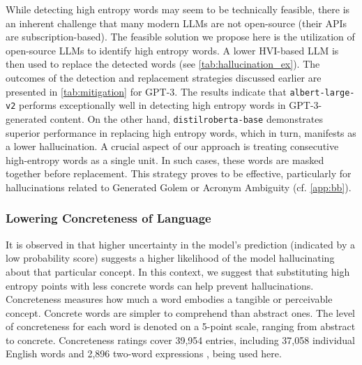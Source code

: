 While detecting high entropy words may seem to be technically feasible, there is an inherent challenge that many modern LLMs are not open-source (their APIs are subscription-based). The feasible solution we propose here is the utilization of open-source LLMs to identify high entropy words. A lower HVI-based LLM is then used to replace the detected words (see \cref{tab:hallucination_ex}). The outcomes of the detection and replacement strategies discussed earlier are presented in \cref{tab:mitigation} for GPT-3. 
The results indicate that \texttt{albert-large-v2} \cite{lan2020albert} performs exceptionally well in detecting high entropy words in GPT-3-generated content. On the other hand, \texttt{distilroberta-base} \cite{Sanh2019DistilBERTAD} demonstrates superior performance in replacing high entropy words, which in turn, manifests as a lower hallucination. A crucial aspect of our approach is treating consecutive high-entropy words as a single unit. In such cases, these words are masked together before replacement. This strategy proves to be effective, particularly for hallucinations related to Generated Golem or Acronym Ambiguity (cf. \cref{app:bb}).

\subsubsection{Lowering Concreteness of Language}
It is observed in \cite{varshney2023stitch} that higher uncertainty in the model's prediction (indicated by a low probability score) suggests a higher likelihood of the model hallucinating about that particular concept. In this context, we suggest that substituting high entropy points with less concrete words can help prevent hallucinations. 
Concreteness \cite{paivio2013dual} measures how much a word embodies a tangible or perceivable concept. Concrete words are simpler to comprehend than abstract ones. The level of concreteness for each word is denoted on a 5-point scale, ranging from abstract to concrete. Concreteness ratings cover 39,954 entries, including 37,058 individual English words and 2,896 two-word expressions \cite{brysbaert2014concreteness}, being used here.


